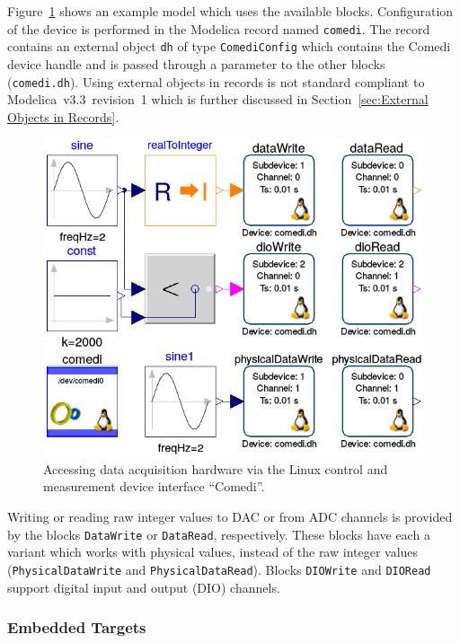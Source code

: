 \documentclass{resources/modelica}
\newcommand{\modelica}[1]{\lstinline[language=modelica]|#1|}
\begin{document}
Figure~\ref{fig:MDDComedi} shows an example model which uses the available
blocks. Configuration of the device is performed in the Modelica record named
\modelica{comedi}. The record contains an external object \modelica{dh} of type
\modelica{ComediConfig} which contains the Comedi device handle and is passed through
a parameter to the other blocks (\modelica{comedi.dh}). Using external
objects in records is not standard compliant to Modelica~v3.3~revision~1
\citep{ModelicaAssociation2014} which is further discussed in
Section~\ref{sec:External Objects in Records}.
\begin{figure}[h]
  \centering
  \includegraphics[width=0.9\columnwidth]{figures/MDDComedi}
  \caption{Accessing data acquisition hardware via the Linux
  control and measurement device interface ``Comedi''.}
  \label{fig:MDDComedi}
\end{figure}

\noindent
Writing or reading raw integer values to DAC or from ADC channels is provided by the
blocks \mbox{\modelica{DataWrite}} or \modelica{DataRead}, respectively. These blocks have
each a variant which works with physical values, instead of the raw integer
values (\modelica{PhysicalDataWrite} and \modelica{PhysicalDataRead}).
Blocks \modelica{DIOWrite} and \modelica{DIORead} support digital input and
output (DIO) channels.

\subsubsection{Embedded Targets}
\label{sec:EmbeddedTargets}
\end{document}

